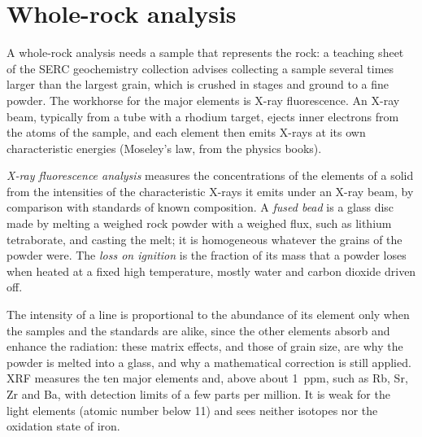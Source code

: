 
\section{Whole-rock analysis}\label{sec:b2:field-lab-methods-2:whole-rock}

A whole-rock analysis needs a sample that represents the rock: a teaching sheet of the SERC
geochemistry collection advises collecting a sample several times larger than the largest grain,
which is crushed in stages and ground to a fine powder. The workhorse for the major elements is
X-ray fluorescence. An X-ray beam, typically from a tube with a rhodium target, ejects inner
electrons from the atoms of the sample, and each element then emits X-rays at its own
characteristic energies (Moseley's law, from the physics books).

\begin{definition}\label{def:b2:field-lab-methods-2:xrf}
\emph{X-ray fluorescence analysis} measures the concentrations
of the elements of a solid from the intensities of the characteristic X-rays it emits under an
X-ray beam, by comparison with standards of known composition. A \emph{fused
bead} is a glass disc made by melting a weighed rock powder with a weighed flux,
such as lithium tetraborate, and casting the melt; it is homogeneous whatever the grains of the
powder were. The \emph{loss on ignition} is the fraction of its mass that
a powder loses when heated at a fixed high temperature, mostly water and carbon dioxide driven off.
\end{definition}

The intensity of a line is proportional to the abundance of its element only when the samples and
the standards are alike, since the other elements absorb and enhance the radiation: these matrix
effects, and those of grain size, are why the powder is melted into a glass, and why a mathematical
correction is still applied. XRF measures the ten major elements and, above about \qty{1}{ppm},
 such as Rb, Sr, Zr and Ba, with detection limits of a few parts per million. It is
weak for the light elements (atomic number below 11) and sees neither isotopes nor the oxidation
state of iron.

